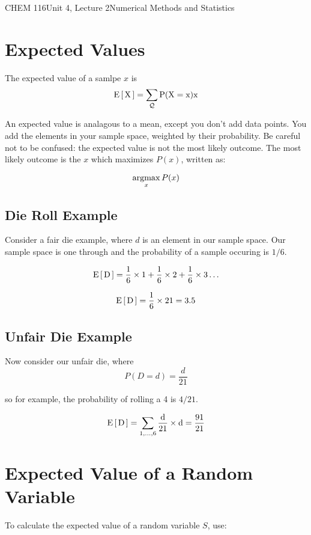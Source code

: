 \documentclass{article}
\begin{document}
\begin{tdoc}{CHEM 116}{Unit 4, Lecture 2}{Numerical Methods and Statistics}

\section{Expected Values}

The expected value of a samlpe $x$ is
\begin{equation}
\rm{E}\left[\,X\,\right] = \sum_\mathcal{Q} P(X=x)x
\end{equation}

An expected value is analagous to a mean, except you don't add data
points. You add the elements in your sample space, weighted by their
probability. Be careful not to be confused: the expected value is not
the most likely outcome. The most likely outcome is the $x$ which
maximizes $P(x)$, written as:

\begin{equation}
\operatorname*{argmax}_x P(x)
\end{equation}

\subsection{Die Roll Example}

Consider a fair die example, where $d$ is an element in our sample
space. Our sample space is one through and the probability of a sample
occuring is $1/6$. 

\[
\rm{E}\left[\,D\,\right] = \frac{1}{6}\times{}1 + \frac{1}{6}\times{}2 + \frac{1}{6}\times{}3 \ldots
\]

\[
\rm{E}\left[\,D\,\right] = \frac{1}{6}\times 21 = 3.5
\]

\subsection{Unfair Die Example}
Now consider our unfair die, where
\[
P(D = d) = \frac{d}{21}
\]

so for example, the probability of rolling a 4 is $4/21$.

\[
\rm{E}\left[\,D\,\right] = \sum_{1,\ldots,6} \frac{d}{21} \times d = \frac{91}{21}
\]

\section{Expected Value of a Random Variable}

To calculate the expected value of a random variable $S$, use:


\end{tdoc}
\end{document}
